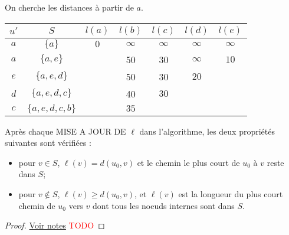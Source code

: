 \begin{myexem}
  On cherche les distances à partir de $a$.\\
	\begin{center}
\end{center}
\begin{center}
\begin{tabular}{|c|c|ccccc|}
\hline
$u'$ & $S$ & $l(a)$ & $l(b)$ & $l(c)$ & $l(d)$ & $l(e)$\\
\hline
$a$ & $\lbrace a \rbrace$ & $\boxed{0}$ & $\infty$ & $\infty$ & $\infty$ &$\infty$\\
$a$ & $\lbrace a,e \rbrace$ && 50 & 30 & $\infty$ & $\boxed{10}$\\
$e$ & $\lbrace a,e,d \rbrace$ && 50 & 30 & $\boxed{20}$ &\\
$d$ & $\lbrace a,e,d,c \rbrace$ && 40 & $\boxed{30}$ & &\\
$c$ & $\lbrace a,e,d,c,b \rbrace$ && $\boxed{35}$ & & &\\
\hline
\end{tabular}
\end{center}
\end{myexem}

\begin{mytheo} 
  Après chaque MISE A JOUR DE $\ell$ dans l’algorithme, les deux propriétés suivantes sont vérifiées :
  \begin{itemize}
    \item pour $v \in S$, $\ell(v) = d(u_0, v)$ et le chemin le plus court de $u_0$ à $v$ reste dans $S$;
    \item pour $v \notin S$, $\ell(v) \geq d(u_0, v)$, et $\ell(v)$ est la longueur du plus court chemin de $u_0$ vers $v$ dont tous les noeuds internes sont dans $S$.
  \end{itemize}
  \begin{proof}
     \href{https://dl.dropboxusercontent.com/u/44092863/Graph_Theory_Romain_Capron.pdf}{Voir notes} \textcolor{red}{TODO}
  \end{proof}
\end{mytheo}

